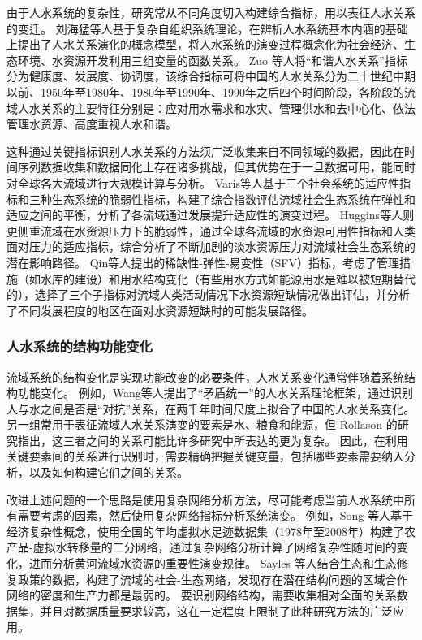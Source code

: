 由于人水系统的复杂性，研究常从不同角度切入构建综合指标，用以表征人\textendash{}水关系的变迁。
刘海猛等人基于复杂自组织系统理论，在辨析人水系统基本内涵的基础上提出了人\textendash{}水关系演化的概念模型，将人水系统的演变过程概念化为社会经济、生态环境、水资源开发利用三组变量的函数关系\cite{liu2014}。
Zuo 等人将“和谐人\textendash{}水关系”指标分为健康度、发展度、协调度\cite{zuo2008}，该综合指标可将中国的人\textendash{}水关系分为二十世纪中期以前、1950年至1980年、1980年至1990年、1990年之后四个时间阶段，各阶段的流域人\textendash{}水关系的主要特征分别是：应对用水需求和水灾、管理供水和去中心化、依法管理水资源、高度重视人水和谐\cite{zuo2016a}。

这种通过关键指标识别人\textendash{}水关系的方法须广泛收集来自不同领域的数据，因此在时间序列数据收集和数据同化上存在诸多挑战，但其优势在于一旦数据可用，能同时对全球各大流域进行大规模计算与分析。
Varis等人基于三个社会系统的适应性指标和三种生态系统的脆弱性指标，构建了综合指数评估流域社会\textendash{}生态系统在弹性和适应之间的平衡，分析了各流域通过发展提升适应性的演变过程\cite{varis2019}。
Huggins等人则更侧重流域在水资源压力下的脆弱性，通过全球各流域的水资源可用性指标和人类面对压力的适应指标，综合分析了不断加剧的淡水资源压力对流域社会\textendash{}生态系统的潜在影响路径\cite{huggins2022}。
Qin等人提出的稀缺性-弹性-易变性（SFV）指标，考虑了管理措施（如水库的建设）和用水结构变化（有些用水方式如能源用水是难以被短期替代的），选择了三个子指标对流域人类活动情况下水资源短缺情况做出评估，并分析了不同发展程度的地区在面对水资源短缺时的可能发展路径\cite{qin2019}。

\subsubsection{人水系统的结构功能变化}

流域系统的结构变化是实现功能改变的必要条件，人\textendash{}水关系变化通常伴随着系统结构功能变化。
例如，Wang等人提出了“矛盾统一”的人\textendash{}水关系理论框架，通过识别人与水之间是否是“对抗”关系，在两千年时间尺度上拟合了中国的人\textendash{}水关系变化\cite{wang2017}。
另一组常用于表征流域人\textendash{}水关系演变的要素是水、粮食和能源，但 Rollason 的研究指出，这三者之间的关系可能比许多研究中所表达的更为复杂\cite{rollason2021}。
因此，在利用关键要素间的关系进行识别时，需要精确把握关键变量，包括哪些要素需要纳入分析，以及如何构建它们之间的关系\cite{zhangzongyong2020, wang2021}。

改进上述问题的一个思路是使用复杂网络分析方法，尽可能考虑当前人水系统中所有需要考虑的因素，然后使用复杂网络指标分析系统演变\cite{sayles2019, bodin2017b}。
例如，Song 等人基于经济复杂性概念，使用全国的年均虚拟水足迹数据集（1978年至2008年）构建了农产品-虚拟水转移量的二分网络，通过复杂网络分析计算了网络复杂性随时间的变化，进而分析黄河流域水资源的重要性演变规律\cite{song2022}。
Sayles 等人结合生态和生态修复政策的数据，构建了流域的社会-生态网络，发现存在潜在结构问题的区域合作网络的密度和生产力都是最弱的\cite{sayles2017}。
要识别网络结构，需要收集相对全面的关系数据集，并且对数据质量要求较高，这在一定程度上限制了此种研究方法的广泛应用。

